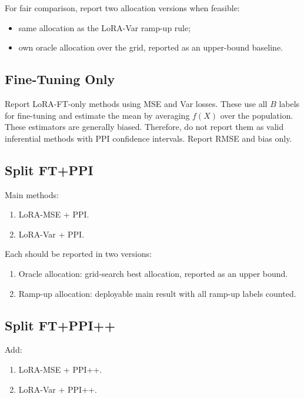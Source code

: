 \documentclass[11pt]{article}
\begin{document}
For fair comparison, report two allocation versions when feasible:

\begin{itemize}
    \item same allocation as the LoRA-Var ramp-up rule;
    \item own oracle allocation over the grid, reported as an upper-bound baseline.
\end{itemize}

\subsection{Fine-Tuning Only}

Report LoRA-FT-only methods using MSE and Var losses. These use all $B$ labels for fine-tuning and estimate the mean by averaging $f(X)$ over the population. These estimators are generally biased. Therefore, do not report them as valid inferential methods with PPI confidence intervals. Report RMSE and bias only.

\subsection{Split FT+PPI}

Main methods:

\begin{enumerate}
    \item LoRA-MSE + PPI.
    \item LoRA-Var + PPI.
\end{enumerate}

Each should be reported in two versions:

\begin{enumerate}
    \item Oracle allocation: grid-search best allocation, reported as an upper bound.
    \item Ramp-up allocation: deployable main result with all ramp-up labels counted.
\end{enumerate}

\subsection{Split FT+PPI++}

Add:

\begin{enumerate}
    \item LoRA-MSE + PPI++.
    \item LoRA-Var + PPI++.
\end{enumerate}
\end{document}
